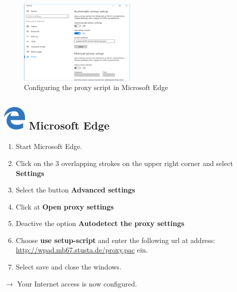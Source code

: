\documentclass[a4paper,12pt]{scrartcl}
\begin{document}
\begin{figure}
	\begin{center}
		\includegraphics[width=0.5\textwidth,keepaspectratio]{Bilder/Proxy_Edge_EN_mb}
	\end{center}
	\caption{Configuring the proxy script in Microsoft Edge}
\end{figure}

\subsection*{\includegraphics[height=1.2cm,keepaspectratio]{Bilder/Mcrosoft_Edge_logo} Microsoft Edge}
\begin{enumerate}
	\item Start Microsoft Edge.
	\item Click on the 3 overlapping strokes on the upper right corner and select \textbf{Settings}
	\item Select the button \textbf{Advanced settings}
	\item Click at \textbf{Open proxy settings}
	\item Deactive the option \textbf{Autodetect the proxy settings}
	\item Choose \textbf{use setup-script} and enter the following url at address: \\ \url{http://wpad.mb67.stusta.de/proxy.pac} ein.
	\item Select save and close the windows.
\end{enumerate}
$\rightarrow$ Your Internet access is now configured.
\end{document}
